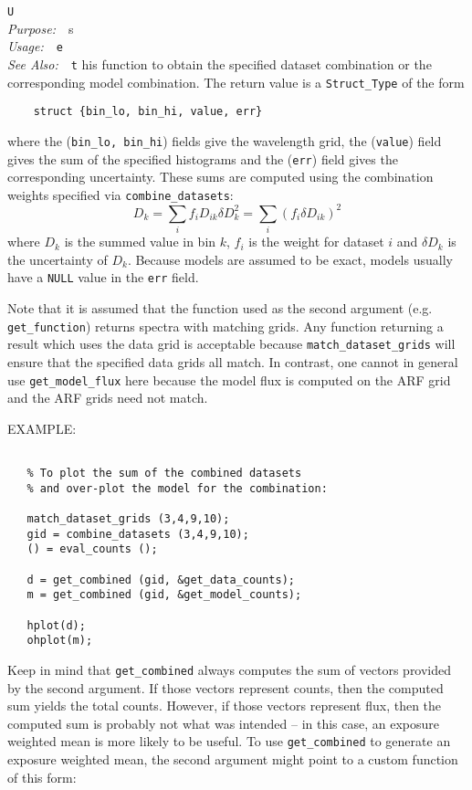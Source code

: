 \documentclass{book}
\makeatletter
\newif\ifpdf
\newenvironment{isisfunction}[4]%
{\index{{#1}@{\tt #1}}%
  \ifpdf
  \else
     \addcontentsline{toc}{subsection}{{#1} -- {#2}}
  \fi
  \vbox{
          \vspace*{\baselineskip}
          {\LARGE\tt #1}\vspace*{\baselineskip}\\
          {{\it Purpose:}~~{#2}}\\
          {{\it Usage:}~~{\tt #3}}\\
          {{\it See Also:}~~{\tt #4}}
       }
}%
{ }
\makeatother
\begin{document}
{\begin{isisfunction}
Use this function to obtain the specified dataset combination
or the corresponding model combination.  The return value is
a \verb|Struct_Type| of the form
\begin{verbatim}
    struct {bin_lo, bin_hi, value, err}
\end{verbatim}
where the (\verb|bin_lo, bin_hi|) fields give the wavelength
grid, the (\verb|value|) field gives the sum of the specified
histograms and the (\verb|err|) field gives the corresponding
uncertainty.  These sums are computed using the combination
weights specified via \verb|combine_datasets|:
\begin{equation}
   D_k = \sum_i f_i D_{ik}
   \delta D_k^2 = \sum_i \left(f_i \delta D_{ik}\right)^2
\end{equation}
where $D_k$ is the summed value in bin $k$, $f_i$ is the weight
for dataset $i$ and $\delta D_k$ is the uncertainty of $D_k$.
Because models are assumed to be exact, models usually have a
\verb|NULL| value in the \verb|err| field.

Note that it is assumed that the function used as the second
argument (e.g. \verb|get_function|) returns spectra with
matching grids. Any function returning a result which uses the
data grid is acceptable because \verb|match_dataset_grids| will
ensure that the specified data grids all match.  In contrast,
one cannot in general use \verb|get_model_flux| here because
the model flux is computed on the ARF grid and the ARF grids
need not match.

EXAMPLE:
\begin{verbatim}

   % To plot the sum of the combined datasets
   % and over-plot the model for the combination:

   match_dataset_grids (3,4,9,10);
   gid = combine_datasets (3,4,9,10);
   () = eval_counts ();

   d = get_combined (gid, &get_data_counts);
   m = get_combined (gid, &get_model_counts);

   hplot(d);
   ohplot(m);

\end{verbatim}

Keep in mind that \verb|get_combined| always computes the sum
of vectors provided by the second argument.  If those vectors
represent counts, then the computed sum yields the total
counts. However, if those vectors represent flux, then the
computed sum is probably not what was intended -- in this case,
an exposure weighted mean is more likely to be useful.  To use
\verb|get_combined| to generate an exposure weighted mean, the
second argument might point to a custom function of this form:


\end{isisfunction}}
\end{document}
